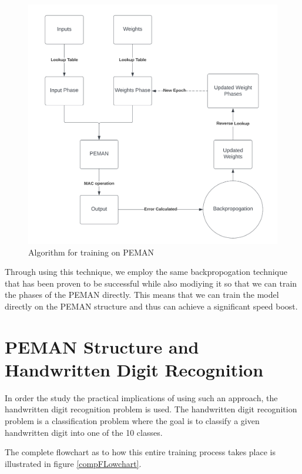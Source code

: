 \begin{figure}
	\centering
	\includegraphics[width=\textwidth]{images/trainOnPemanAlgo.png}
	\caption{Algorithm for training on PEMAN}
	\label{trainOnPemanAlgo}
\end{figure}

Through using this technique, we employ the same backpropogation technique that has been proven to be successful while also modiying it so that we can train the phases of the PEMAN directly. This means that we can train the model directly on the PEMAN structure and thus can achieve a significant speed boost.

\section{PEMAN Structure and Handwritten Digit Recognition}

In order the study the practical implications of using such an approach, the handwritten digit recognition problem is used. The handwritten digit recognition problem is a classification problem where the goal is to classify a given handwritten digit into one of the 10 classes.

The complete flowchart as to how this entire training process takes place is illustrated in figure \ref{compFLowchart}.

